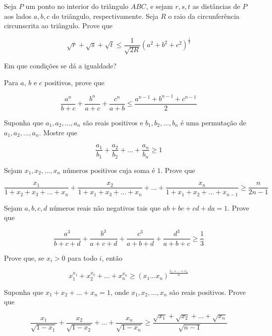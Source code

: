 \begin{questao}
  Seja $P$ um ponto no interior do triângulo $ABC$, e sejam $r,s,t$ as
  distâncias de $P$ aos lados $a,b,c$ do triângulo, respectivamente. Seja $R$ o
  raio da circunferência circunscrita ao triângulo. Prove que

  $$ \sqrt{r} + \sqrt{s} + \sqrt{t} \leq
  \frac{1}{\sqrt{2R}}(a^2+b^2+c^2)^{\frac{1}{2}} $$

  Em que condições se dá a igualdade?
\end{questao}

\begin{questao}
  Para $a$, $b$ e $c$ positivos, prove que

  $$ \frac{a^n}{b+c} + \frac{b^n}{a+c} + \frac{c^n}{a+b} \leq
  \frac{a^{n-1}+b^{n-1}+c^{n-1}}{2} $$
\end{questao}

\begin{questao}
  Suponha que $a_1,a_2,\ldots,a_n$ são reais positivos e $b_1,b_2,\ldots,b_n$ é
  uma permutação de $a_1,a_2,\ldots,a_n$. Mostre que

  $$ \frac{a_1}{b_1} + \frac{a_2}{b_2} + \ldots + \frac{a_n}{b_n} \geq 1 $$
\end{questao}

\begin{questao}
  Sejam $x_1, x_2,\ldots, x_n$ números positivos cuja soma é $1$. Prove que

  $$ \frac{x_1}{1+x_2+x_3+\ldots+x_n} + \frac{x_2}{1+x_1+x_3+\ldots+x_n} +
  \ldots + \frac{x_n}{1+x_1+x_2+\ldots+x_{n-1}} \geq \frac{n}{2n-1} $$
\end{questao}

\begin{questao}
  Sejam $a,b,c,d$ números reais não negativos tais que $ab+bc+cd+da = 1$. Prove
  que

  $$ \frac{a^3}{b+c+d} + \frac{b^3}{a+c+d} + \frac{c^3}{a+b+d} +
  \frac{d^3}{a+b+c} \geq \frac{1}{3} $$
\end{questao}

\begin{questao}
  Prove que, se $x_i>0$ para todo $i$, então

  $$ x_1^{x_1} + x_2^{x_2} + \ldots + x_n^{x_n} \geq (x_1\ldots
  x_n)^{\frac{x_1+\ldots+x_n}{n}} $$
\end{questao}

\begin{questao}
  Suponha que $x_1+x_2+\ldots+x_n=1$, onde $x_1, x_2, \ldots, x_n$ são reais
  positivos. Prove que

  $$ \frac{x_1}{\sqrt{1-x_1}} + \frac{x_2}{\sqrt{1-x_2}} + \ldots +
  \frac{x_n}{\sqrt{1-x_n}} \geq
  \frac{\sqrt{x_1}+\sqrt{x_2}+\ldots+\sqrt{x_n}}{\sqrt{n-1}} $$
\end{questao}

